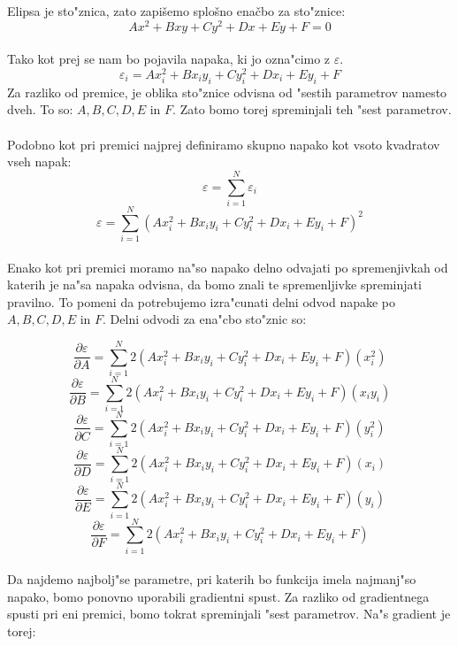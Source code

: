 \documentclass[a4paper, 12pt]{article}
\begin{document}
	Elipsa je sto"znica, zato zapišemo splošno enačbo za sto"znice:
	$$Ax^2 + Bxy + Cy^2 + Dx + Ey + F = 0$$

	\paragraph{}
	Tako kot prej se nam bo pojavila napaka, ki jo ozna"cimo z $\varepsilon$.
	$$\varepsilon_i = Ax_i^2 + Bx_iy_i + Cy_i^2 + Dx_i + Ey_i + F$$
	Za razliko od premice, je oblika sto"znice odvisna od "sestih parametrov namesto dveh. To so: $A, B, C, D, E$ in $F$. Zato bomo torej spreminjali teh "sest parametrov.

	\paragraph{}
	Podobno kot pri premici najprej definiramo skupno napako kot vsoto kvadratov vseh napak:
	\[\varepsilon = \sum_{i=1}^{N}\varepsilon_i\]
	\[\varepsilon = \sum_{i=1}^{N} (Ax_i^2 + Bx_iy_i + Cy_i^2 + Dx_i + Ey_i + F)^2\]

	\paragraph{}
	Enako kot pri premici moramo na"so napako delno odvajati po spremenjivkah od katerih je na"sa napaka odvisna, da bomo znali te spremenljivke spreminjati pravilno. To pomeni da potrebujemo izra"cunati delni odvod napake po $A, B, C, D, E$ in $F$. Delni odvodi za ena"cbo sto"znic so:

	$$\frac{\partial \varepsilon}{\partial A} = \sum_{i=1}^{N}2(Ax_i^2 + Bx_iy_i + Cy_i^2 + Dx_i + Ey_i + F)(x_i^2)$$
	$$\frac{\partial \varepsilon}{\partial B} = \sum_{i=1}^{N}2(Ax_i^2 + Bx_iy_i + Cy_i^2 + Dx_i + Ey_i + F)(x_iy_i)$$
	$$\frac{\partial \varepsilon}{\partial C} = \sum_{i=1}^{N}2(Ax_i^2 + Bx_iy_i + Cy_i^2 + Dx_i + Ey_i + F)(y_i^2)$$
	$$\frac{\partial \varepsilon}{\partial D} = \sum_{i=1}^{N}2(Ax_i^2 + Bx_iy_i + Cy_i^2 + Dx_i + Ey_i + F)(x_i)$$
	$$\frac{\partial \varepsilon}{\partial E} = \sum_{i=1}^{N}2(Ax_i^2 + Bx_iy_i + Cy_i^2 + Dx_i + Ey_i + F)(y_i)$$
	$$\frac{\partial \varepsilon}{\partial F} = \sum_{i=1}^{N}2(Ax_i^2 + Bx_iy_i + Cy_i^2 + Dx_i + Ey_i + F)$$

	\paragraph{}
	Da najdemo najbolj"se parametre, pri katerih bo funkcija imela najmanj"so napako, bomo ponovno uporabili gradientni spust. Za razliko od gradientnega spusti pri eni premici, bomo tokrat spreminjali "sest parametrov. Na"s gradient je torej:
	
\end{document}

